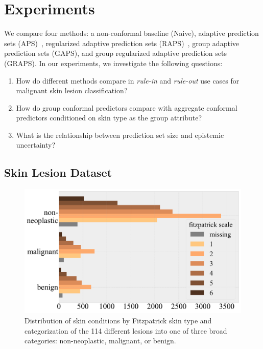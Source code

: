 \documentclass[letterpaper]{article} %
\begin{document}
\section{Experiments}
    We compare four methods: a non-conformal baseline (Naive), adaptive prediction sets (APS)~\cite{NEURIPS2020_244edd7e}, regularized adaptive prediction sets (RAPS)~\cite{angelopoulos2021uncertainty}, group adaptive prediction sets (GAPS), and group regularized adaptive prediction sets (GRAPS).
    In our experiments, we investigate the following questions:
    \begin{enumerate}
        \item How do different methods compare in \textit{rule-in} and \textit{rule-out} use cases for malignant skin lesion classification?
        \item How do group conformal predictors compare with aggregate conformal predictors conditioned on skin type as the group attribute?
        \item What is the relationship between prediction set size and epistemic uncertainty?
    \end{enumerate}

    \subsection{Skin Lesion Dataset}
        \begin{figure}[t]
        \centering
        \includegraphics[width=0.99\columnwidth]{LaTeX/fitz-subgroup-class-dist.pdf}
        \caption{Distribution of skin conditions by Fitzpatrick skin type and categorization of the 114 different lesions into one of three broad categories: non-neoplastic, malignant, or benign.}
        \label{fig:fitz-dist}
        \end{figure}
\end{document}
